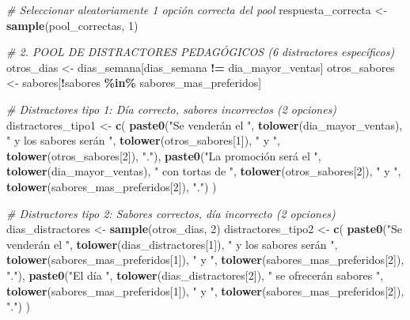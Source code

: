 \documentclass[
]{article}
\newenvironment{Shaded}{\begin{snugshade}}{\end{snugshade}}
\newcommand{\CommentTok}[1]{\textcolor[rgb]{0.56,0.35,0.01}{\textit{#1}}}
\newcommand{\DecValTok}[1]{\textcolor[rgb]{0.00,0.00,0.81}{#1}}
\newcommand{\FunctionTok}[1]{\textcolor[rgb]{0.13,0.29,0.53}{\textbf{#1}}}
\newcommand{\NormalTok}[1]{#1}
\newcommand{\OtherTok}[1]{\textcolor[rgb]{0.56,0.35,0.01}{#1}}
\newcommand{\SpecialCharTok}[1]{\textcolor[rgb]{0.81,0.36,0.00}{\textbf{#1}}}
\newcommand{\StringTok}[1]{\textcolor[rgb]{0.31,0.60,0.02}{#1}}
\begin{document}
\begin{Shaded}
\begin{Highlighting}[]
  \CommentTok{\# Seleccionar aleatoriamente 1 opción correcta del pool}
\NormalTok{  respuesta\_correcta }\OtherTok{\textless{}{-}} \FunctionTok{sample}\NormalTok{(pool\_correctas, }\DecValTok{1}\NormalTok{)}

  \CommentTok{\# 2. POOL DE DISTRACTORES PEDAGÓGICOS (6 distractores específicos)}
\NormalTok{  otros\_dias }\OtherTok{\textless{}{-}}\NormalTok{ dias\_semana[dias\_semana }\SpecialCharTok{!=}\NormalTok{ dia\_mayor\_ventas]}
\NormalTok{  otros\_sabores }\OtherTok{\textless{}{-}}\NormalTok{ sabores[}\SpecialCharTok{!}\NormalTok{sabores }\SpecialCharTok{\%in\%}\NormalTok{ sabores\_mas\_preferidos]}

  \CommentTok{\# Distractores tipo 1: Día correcto, sabores incorrectos (2 opciones)}
\NormalTok{  distractores\_tipo1 }\OtherTok{\textless{}{-}} \FunctionTok{c}\NormalTok{(}
    \FunctionTok{paste0}\NormalTok{(}\StringTok{"Se venderán el "}\NormalTok{, }\FunctionTok{tolower}\NormalTok{(dia\_mayor\_ventas),}
           \StringTok{" y los sabores serán "}\NormalTok{, }\FunctionTok{tolower}\NormalTok{(otros\_sabores[}\DecValTok{1}\NormalTok{]),}
           \StringTok{" y "}\NormalTok{, }\FunctionTok{tolower}\NormalTok{(otros\_sabores[}\DecValTok{2}\NormalTok{]), }\StringTok{"."}\NormalTok{),}
    \FunctionTok{paste0}\NormalTok{(}\StringTok{"La promoción será el "}\NormalTok{, }\FunctionTok{tolower}\NormalTok{(dia\_mayor\_ventas),}
           \StringTok{" con tortas de "}\NormalTok{, }\FunctionTok{tolower}\NormalTok{(otros\_sabores[}\DecValTok{2}\NormalTok{]),}
           \StringTok{" y "}\NormalTok{, }\FunctionTok{tolower}\NormalTok{(sabores\_mas\_preferidos[}\DecValTok{2}\NormalTok{]), }\StringTok{"."}\NormalTok{)}
\NormalTok{  )}

  \CommentTok{\# Distractores tipo 2: Sabores correctos, día incorrecto (2 opciones)}
\NormalTok{  dias\_distractores }\OtherTok{\textless{}{-}} \FunctionTok{sample}\NormalTok{(otros\_dias, }\DecValTok{2}\NormalTok{)}
\NormalTok{  distractores\_tipo2 }\OtherTok{\textless{}{-}} \FunctionTok{c}\NormalTok{(}
    \FunctionTok{paste0}\NormalTok{(}\StringTok{"Se venderán el "}\NormalTok{, }\FunctionTok{tolower}\NormalTok{(dias\_distractores[}\DecValTok{1}\NormalTok{]),}
           \StringTok{" y los sabores serán "}\NormalTok{, }\FunctionTok{tolower}\NormalTok{(sabores\_mas\_preferidos[}\DecValTok{1}\NormalTok{]),}
           \StringTok{" y "}\NormalTok{, }\FunctionTok{tolower}\NormalTok{(sabores\_mas\_preferidos[}\DecValTok{2}\NormalTok{]), }\StringTok{"."}\NormalTok{),}
    \FunctionTok{paste0}\NormalTok{(}\StringTok{"El día "}\NormalTok{, }\FunctionTok{tolower}\NormalTok{(dias\_distractores[}\DecValTok{2}\NormalTok{]),}
           \StringTok{" se ofrecerán sabores "}\NormalTok{, }\FunctionTok{tolower}\NormalTok{(sabores\_mas\_preferidos[}\DecValTok{1}\NormalTok{]),}
           \StringTok{" y "}\NormalTok{, }\FunctionTok{tolower}\NormalTok{(sabores\_mas\_preferidos[}\DecValTok{2}\NormalTok{]), }\StringTok{"."}\NormalTok{)}
\NormalTok{  )}


\end{Highlighting}
\end{Shaded}
\end{document}
